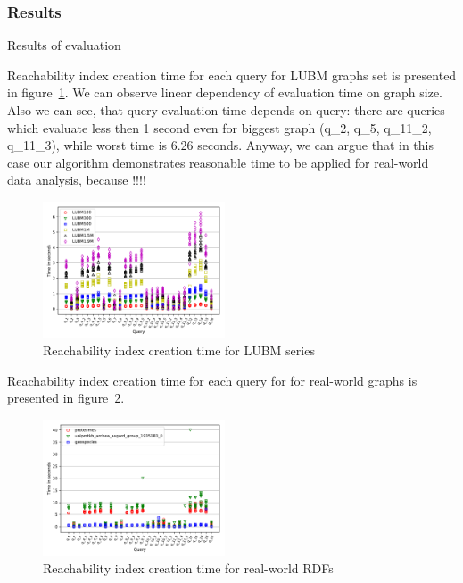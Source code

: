 \subsubsection{Results}

Results of evaluation

Reachability index creation time for each query for LUBM graphs set is presented in figure~\ref{fig:lubm_all_qs}.
We can observe linear dependency of evaluation time on graph size.
Also we can see, that query evaluation time depends on query: there are queries which evaluate less then 1 second even for biggest graph (q\_2, q\_5, q\_11\_2, q\_11\_3), while worst time is 6.26 seconds.
Anyway, we can argue that in this case our algorithm demonstrates reasonable time to be applied for real-world data analysis, because  !!!!

\begin{figure}
   \includegraphics[width=0.48\textwidth]{data/LUBM_all.pdf}
   \caption{Reachability index creation time for LUBM series}
   \label{fig:lubm_all_qs}
\end{figure}


Reachability index creation time for each query for for real-world graphs is presented in figure~\ref{fig:other_all_qs}.

\begin{figure}
   \includegraphics[width=0.48\textwidth]{data/other_all.pdf}
   \caption{Reachability index creation time for real-world RDFs}
   \label{fig:other_all_qs}
\end{figure}

